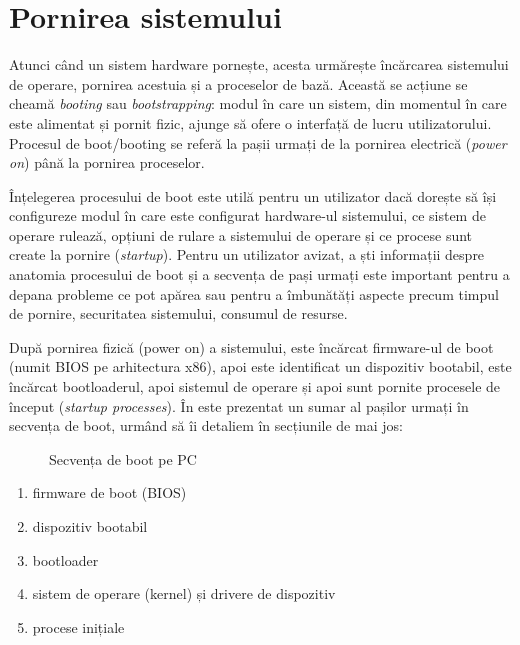 \chapter{Pornirea sistemului}
\label{chapter:boot}

Atunci când un sistem hardware pornește, acesta urmărește încărcarea sistemului
de operare, pornirea acestuia și a proceselor de bază. Această se acțiune se
cheamă \textit{booting} sau \textit{bootstrapping}: modul în care un sistem, din momentul în care
este alimentat și pornit fizic, ajunge să ofere o interfață de lucru
utilizatorului. Procesul de boot/booting se referă la pașii urmați de la
pornirea electrică (\textit{power on}) până la pornirea proceselor.

Înțelegerea procesului de boot este utilă pentru un utilizator dacă dorește să
își configureze modul în care este configurat hardware-ul sistemului, ce sistem
de operare rulează, opțiuni de rulare a sistemului de operare și ce procese sunt
create la pornire (\textit{startup}). Pentru un utilizator avizat, a ști informații
despre anatomia procesului de boot și a secvența de pași urmați este important
pentru a depana probleme ce pot apărea sau pentru a îmbunătăți aspecte precum
timpul de pornire, securitatea sistemului, consumul de resurse.

După pornirea fizică
(power on) a sistemului, este încărcat firmware-ul de boot (numit BIOS pe
arhitectura x86), apoi este identificat un dispozitiv bootabil, este încărcat
bootloaderul, apoi sistemul de operare și apoi sunt pornite procesele de
început (\textit{startup processes}). În  este prezentat un sumar al
pașilor urmați în secvența de boot, urmând să îi detaliem în secțiunile de mai
jos:

\begin{figure}[htbp]
	\centering
	\def\svgwidth{0.5\columnwidth}
	
        \caption{Secvența de boot pe PC}
	\label{fig:boot:sequence}
\end{figure}

\begin{enumerate}
	\item firmware de boot (BIOS)
	\item dispozitiv bootabil
	\item bootloader
	\item sistem de operare (kernel) și drivere de dispozitiv
	\item procese inițiale
\end{enumerate}


